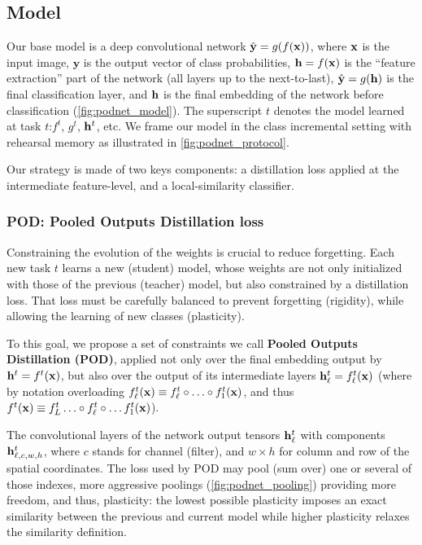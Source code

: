 \subsection{Model}
\label{sec:podnet_model}

Our base model is a deep convolutional network $\hat{\mathbf{y}} = g(f(\mathbf{x}))$, where $\mathbf{x}$ is the input image,
$\mathbf{y}$ is the output vector of class probabilities, $\mathbf{h} = f(\mathbf{x})$ is the ``feature
extraction'' part of the network (all layers up to the next-to-last), $\hat{\mathbf{y}} = g(\mathbf{h})$ is the final
classification layer, and $\mathbf{h}$ is the final embedding of the network before classification
(\autoref{fig:podnet_model}). The superscript $t$ denotes the model learned at task $t$:$f^{t}$,
$g^{t}$, $\mathbf{h}^{t}$, etc. We frame our model in the class incremental setting with rehearsal memory
as illustrated in \autoref{fig:podnet_protocol}.

Our strategy is made of two keys components: a distillation loss applied at the intermediate
feature-level, and a local-similarity classifier.

\subsubsection{POD: Pooled Outputs Distillation loss}
\label{sec:podnet_pod}

Constraining the evolution of the weights is crucial to reduce forgetting. Each new task $t$ learns
a new (student) model, whose weights are not only initialized with those of the previous (teacher)
model, but also constrained by a distillation loss. That loss must be carefully balanced to prevent
forgetting (rigidity), while allowing the learning of new classes (plasticity).

To this goal, we propose a set of constraints we call \textbf{Pooled Outputs Distillation (POD)},
applied not only over the final embedding output by $\mathbf{h}^{t}=f^{t}(\mathbf{x})$, but also over the output
of its intermediate layers $\mathbf{h}^{t}_\ell=f^{t}_\ell(\mathbf{x})$ (where by notation overloading
$f^{t}_\ell(\mathbf{x})\equiv f^{t}_\ell\circ\ldots\circ f^{t}_1(\mathbf{x})$, and thus $f^{t}(\mathbf{x})\equiv
    f^{t}_L\ldots\circ f^{t}_\ell\circ\ldots f^{t}_1(\mathbf{x})$).

The convolutional layers of the network output tensors $\mathbf{h}^{t}_{\ell}$ with components
$\mathbf{h}^{t}_{\ell,c,w,h}$, where $c$ stands for channel (filter), and $w\times h$ for column and row of
the spatial coordinates. The loss used by POD may pool (sum over) one or several of those indexes,
more aggressive poolings (\autoref{fig:podnet_pooling}) providing more freedom, and thus,
plasticity: the lowest possible plasticity imposes an exact similarity between the previous and
current model while higher plasticity relaxes the similarity definition.

